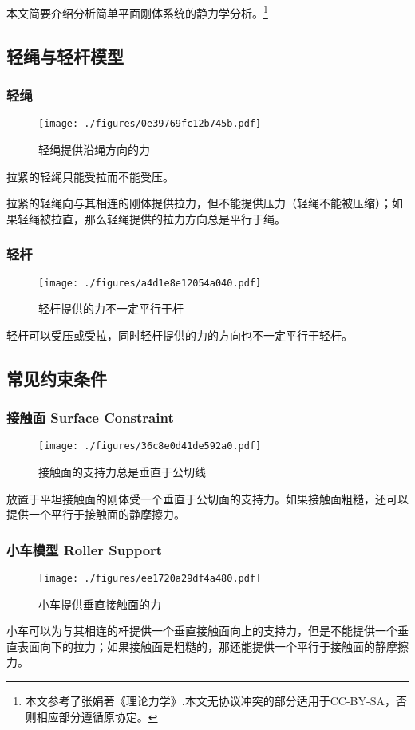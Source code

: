 
本文简要介绍分析简单平面刚体系统的静力学分析。\footnote{本文参考了张娟著《理论力学》.本文无协议冲突的部分适用于CC-BY-SA，否则相应部分遵循原协定。}

\subsection{轻绳与轻杆模型}
\subsubsection{轻绳}
\begin{figure}[ht]
\centering
\texttt{[image: ./figures/0e39769fc12b745b.pdf]}
\caption{轻绳提供沿绳方向的力} \label{fig_RGDFA_1}
\end{figure}
拉紧的轻绳只能受拉而不能受压。

拉紧的轻绳向与其相连的刚体提供拉力，但不能提供压力（轻绳不能被压缩）；如果轻绳被拉直，那么轻绳提供的拉力方向总是平行于绳。

\subsubsection{轻杆}
\begin{figure}[ht]
\centering
\texttt{[image: ./figures/a4d1e8e12054a040.pdf]}
\caption{轻杆提供的力不一定平行于杆} \label{fig_RGDFA_2}
\end{figure}
轻杆可以受压或受拉，同时轻杆提供的力的方向也不一定平行于轻杆。

\subsection{常见约束条件}
\subsubsection{接触面 Surface Constraint}
\begin{figure}[ht]
\centering
\texttt{[image: ./figures/36c8e0d41de592a0.pdf]}
\caption{接触面的支持力总是垂直于公切线} \label{fig_RGDFA_3}
\end{figure}

放置于平坦接触面的刚体受一个垂直于公切面的支持力。如果接触面粗糙，还可以提供一个平行于接触面的静摩擦力。
\subsubsection{小车模型 Roller Support}
\begin{figure}[ht]
\centering
\texttt{[image: ./figures/ee1720a29df4a480.pdf]}
\caption{小车提供垂直接触面的力} \label{fig_RGDFA_5}
\end{figure}
小车可以为与其相连的杆提供一个垂直接触面向上的支持力，但是不能提供一个垂直表面向下的拉力；如果接触面是粗糙的，那还能提供一个平行于接触面的静摩擦力。
